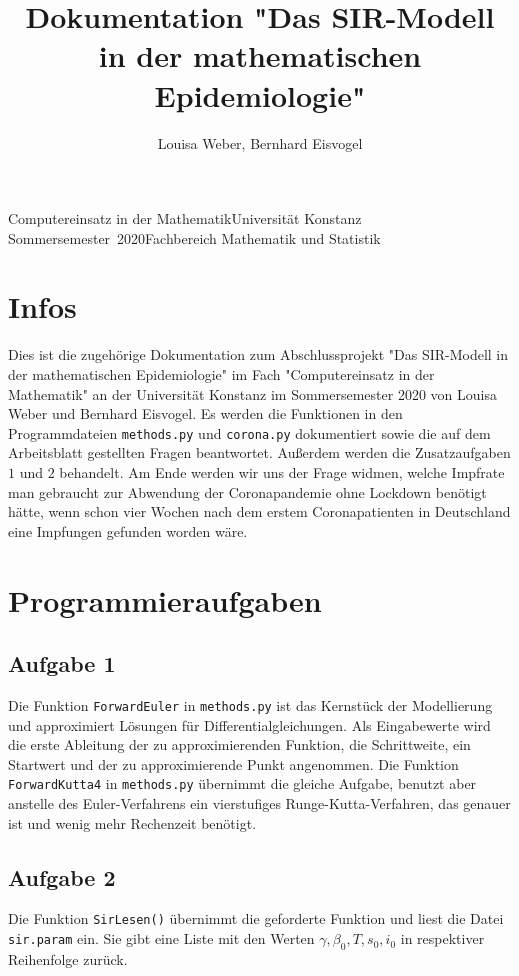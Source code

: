 \documentclass[12pt]{article}
\date{}
\title{Dokumentation "Das SIR-Modell in der mathematischen Epidemiologie"}
\author{Louisa Weber, Bernhard Eisvogel}
\begin{document}
	\maketitle

	
	\vspace{17cm}
	
	\small \vspace{-1mm} Computereinsatz in der Mathematik\hfill Universität Konstanz\\ Sommersemester~2020\hfill Fachbereich Mathematik und Statistik

\newpage
\tableofcontents
\newpage

\section{Infos}
Dies ist die zugehörige Dokumentation zum Abschlussprojekt "Das SIR-Modell in der mathematischen Epidemiologie" im Fach "Computereinsatz in der Mathematik" an der Universität Konstanz im Sommersemester 2020 von Louisa Weber und Bernhard Eisvogel. Es werden die Funktionen in den Programmdateien \verb|methods.py| und \verb|corona.py| dokumentiert sowie die auf dem Arbeitsblatt gestellten Fragen beantwortet. Außerdem werden die Zusatzaufgaben $1$ und $2$ behandelt. Am Ende werden wir uns der Frage widmen, welche Impfrate man gebraucht zur Abwendung der Coronapandemie ohne Lockdown benötigt hätte, wenn schon vier Wochen nach dem erstem Coronapatienten in Deutschland eine Impfungen gefunden worden wäre.

\section{Programmieraufgaben}
\subsection{Aufgabe 1}
Die Funktion \verb|ForwardEuler| in \verb|methods.py|  ist das Kernstück der Modellierung und approximiert Lösungen für Differentialgleichungen. Als Eingabewerte wird die erste Ableitung der zu approximierenden Funktion, die Schrittweite, ein Startwert und der zu approximierende Punkt angenommen. Die Funktion \verb|ForwardKutta4|   in \verb|methods.py|  übernimmt die gleiche Aufgabe, benutzt aber anstelle des Euler-Verfahrens ein vierstufiges Runge-Kutta-Verfahren, das genauer ist und wenig mehr Rechenzeit benötigt.
\subsection{Aufgabe 2}
Die Funktion \verb|SirLesen()| übernimmt die geforderte Funktion und liest die Datei \verb|sir.param| ein. Sie gibt eine Liste mit den Werten $\gamma,\beta_0,T,s_0,i_0$ in respektiver Reihenfolge zurück.
\end{document}
